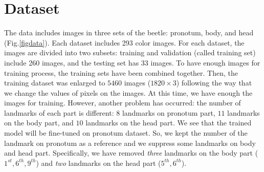 \documentclass[12pt,a4paper]{article}
\begin{document}
\section{Dataset}
The data includes images in three sets of the beetle: pronotum, body, and head (Fig.\ref{figdata}). Each dataset includes 293 color images. For each dataset, the images are divided into two subsets: training and validation (called training set) include 260 images, and the testing set has 33 images. To have enough images for training process, the training sets have been combined together. Then, the training dataset was enlarged to $5460$ images ($1820 \times 3$) following the way that we change the values of pixels on the images. At this time, we have enough the images for training. However, another problem has occurred: the number of landmarks of each part is different: $8$ landmarks on pronotum part, $11$ landmarks on the body part, and $10$ landmarks on the head part. We see that the trained model will be fine-tuned on pronotum dataset. So, we kept the number of the landmark on pronotum as a reference and we suppress some landmarks on body and head part. Specifically, we have removed \textit{three} landmarks on the body part ($1^{st}, 6^{th}, 9^{th}$) and \textit{two} landmarks on the head part ($5^{th}, 6^{th}$).
\end{document}
